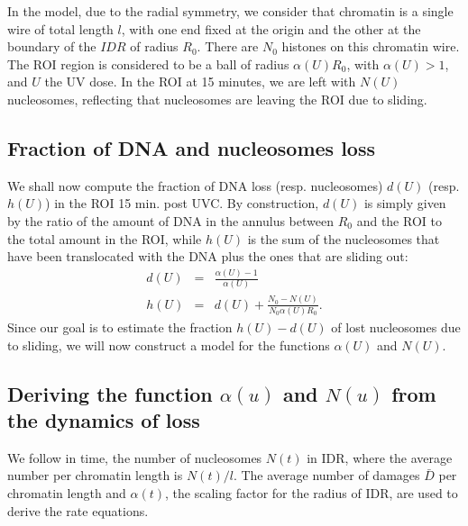 \documentclass[12pt]{article}
\newcommand{\beq}{\begin{eqnarray}}
\newcommand{\eeq}{\end{eqnarray}}
\begin{document}
In the model, due to the radial symmetry, we consider that chromatin is a single wire of total length $l$, with one end fixed at the origin and the other at the boundary of the $IDR$ of radius $R_0$. There are $N_0$ histones on this chromatin wire.  The ROI region is considered to be a ball of radius $\alpha(U) R_0$, with  $\alpha(U)>1$, and $U$ the UV dose. In the ROI at 15 minutes, we are left with $N(U)$ nucleosomes, reflecting that nucleosomes are leaving the ROI due to sliding.
\subsection{Fraction of DNA and nucleosomes loss }\label{subsection:fractionOfDNAandNucleosomeLoss}
We shall now compute the fraction of DNA loss (resp. nucleosomes) $d(U)$ (resp. $h(U)$) in the ROI 15 min. post UVC. By construction, $d(U)$ is simply given by the ratio of the amount of DNA in the annulus between $R_0$ and the ROI to the total amount in the ROI, while $h(U)$ is the sum of the nucleosomes that have been translocated with the DNA plus the ones that are sliding out:
\beq
d(U)&=& \frac{\alpha(U) -1}{\alpha(U)} \\
h(U)&=&d(U)+\frac{N_0-N(U)}{N_0 \alpha(U) R_0}.
\eeq
Since our goal is to estimate the fraction $h(U)-d(U)$ of lost nucleosomes due to sliding, we will now construct a model for the functions $\alpha(U)$ and $N(U)$.
\subsection{Deriving the function $\alpha(u)$ and $N(u)$ from the dynamics of loss}
We follow in time, the number of nucleosomes $N(t)$ in IDR, where the average number per chromatin length is $N(t)/l$. The average number of damages $\bar{D}$ per chromatin length and $\alpha(t)$, the scaling factor for the radius of IDR, are used to derive the rate equations.
\end{document}
